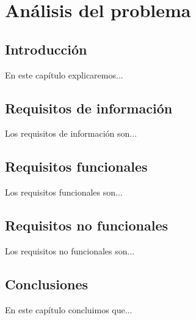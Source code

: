 \chapter{Análisis del problema}\label{cap:analisis}

\section{Introducción}
En este capítulo explicaremos...

\section{Requisitos de información}
Los requisitos de información son...

\section{Requisitos funcionales}
Los requisitos funcionales son...

\section{Requisitos no funcionales}
Los requisitos no funcionales son...

\section{Conclusiones}
En este capítulo concluimos que...
